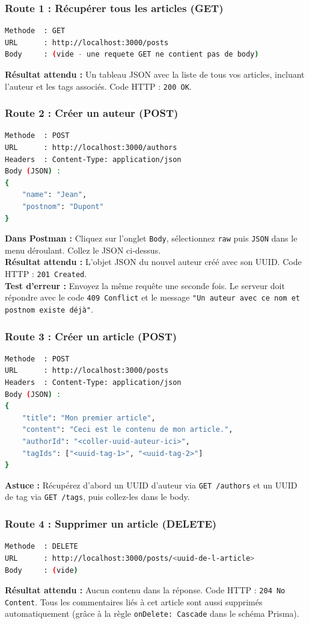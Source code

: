 \subsubsection{Route 1 : Récupérer tous les articles (GET)}
\begin{lstlisting}[language=bash]
Methode  : GET
URL      : http://localhost:3000/posts
Body     : (vide - une requete GET ne contient pas de body)
\end{lstlisting}
\textbf{Résultat attendu :} Un tableau JSON avec la liste de tous vos articles, incluant l'auteur et les tags associés. Code HTTP : \texttt{200 OK}.

\subsubsection{Route 2 : Créer un auteur (POST)}
\begin{lstlisting}[language=bash]
Methode  : POST
URL      : http://localhost:3000/authors
Headers  : Content-Type: application/json
Body (JSON) :
{
    "name": "Jean",
    "postnom": "Dupont"
}
\end{lstlisting}
\textbf{Dans Postman :} Cliquez sur l'onglet \texttt{Body}, sélectionnez \texttt{raw} puis \texttt{JSON} dans le menu déroulant. Collez le JSON ci-dessus.\\
\textbf{Résultat attendu :} L'objet JSON du nouvel auteur créé avec son UUID. Code HTTP : \texttt{201 Created}.\\
\textbf{Test d'erreur :} Envoyez la même requête une seconde fois. Le serveur doit répondre avec le code \texttt{409 Conflict} et le message \texttt{"Un auteur avec ce nom et postnom existe déjà"}.

\subsubsection{Route 3 : Créer un article (POST)}
\begin{lstlisting}[language=bash]
Methode  : POST
URL      : http://localhost:3000/posts
Headers  : Content-Type: application/json
Body (JSON) :
{
    "title": "Mon premier article",
    "content": "Ceci est le contenu de mon article.",
    "authorId": "<coller-uuid-auteur-ici>",
    "tagIds": ["<uuid-tag-1>", "<uuid-tag-2>"]
}
\end{lstlisting}
\textbf{Astuce :} Récupérez d'abord un UUID d'auteur via \texttt{GET /authors} et un UUID de tag via \texttt{GET /tags}, puis collez-les dans le body.

\subsubsection{Route 4 : Supprimer un article (DELETE)}
\begin{lstlisting}[language=bash]
Methode  : DELETE
URL      : http://localhost:3000/posts/<uuid-de-l-article>
Body     : (vide)
\end{lstlisting}
\textbf{Résultat attendu :} Aucun contenu dans la réponse. Code HTTP : \texttt{204 No Content}. Tous les commentaires liés à cet article sont aussi supprimés automatiquement (grâce à la règle \texttt{onDelete: Cascade} dans le schéma Prisma).

